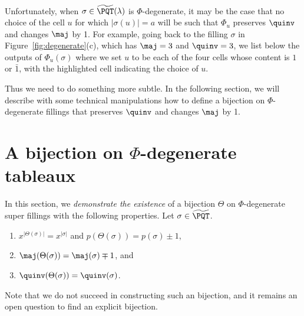 Unfortunately, when $\sigma\in\widetilde{\PQT}(\lambda)$ is $\Phi$-degenerate, it may be the case that no choice of the cell $u$ for which $|\sigma(u)|=a$ will be such that $\Phi_u$ preserves $\quinv$ and changes $\maj$ by 1. For example, going back to the filling $\sigma$ in Figure~\ref{fig:degenerate}(c), which has $\maj=3$ and $\quinv=3$, we list below the outputs of $\Phi_u(\sigma)$ where we set $u$ to be each of the four cells whose content is $1$ or $\bar{1}$, with the highlighted cell indicating the choice of $u$.

\begin{center}
\quad
{}
\quad
{}
\quad
{}
\end{center}


Thus we need to do something more subtle. In the following section, we will describe with some technical manipulations how to define a bijection on $\Phi$-degenerate fillings that preserves $\quinv$ and changes $\maj$ by 1. 


\section{A bijection on $\Phi$-degenerate tableaux}
\label{sec:Phi-degenerate}

In this section, we \emph{demonstrate the existence} of a bijection $\Theta$ on $\Phi$-degenerate super fillings with the following properties. Let $\sigma\in\widetilde{\PQT}$. 
\begin{enumerate}[label=\roman*.]
\item $x^{|\Theta(\sigma)|}=x^{|\sigma|}$ and $p(\Theta(\sigma))=p(\sigma)  \pm 1$,
\item $\maj(\Theta(\sigma))=\maj(\sigma)\mp 1$, and
\item $\quinv(\Theta(\sigma))=\quinv(\sigma)$.
\end{enumerate}
Note that we do not succeed in constructing such an bijection, and it remains an open question to find an explicit bijection.

